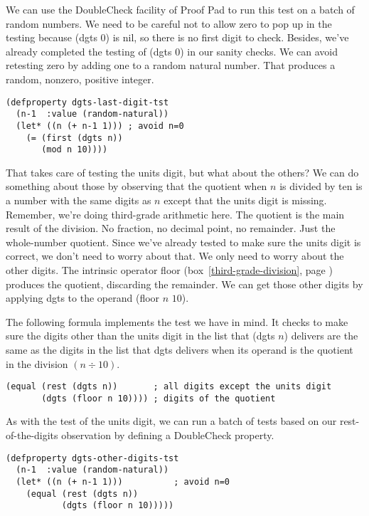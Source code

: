 We can use the DoubleCheck facility of Proof Pad to run this test on a batch of random numbers.
We need to be careful not to allow zero to pop up in the testing
because \textsf{(dgts 0)} is nil, so there is no first digit to check.
Besides, we've already completed the testing of \textsf{(dgts 0)} in our sanity checks.
We can avoid retesting zero by adding one to a random natural number.
That produces a random, nonzero, positive integer.
\begin{code}
\begin{verbatim}
(defproperty dgts-last-digit-tst
  (n-1  :value (random-natural))
  (let* ((n (+ n-1 1))) ; avoid n=0
    (= (first (dgts n))
       (mod n 10))))
\end{verbatim}
\end{code}

That takes care of testing the units digit, but what about the others?
We can do something about those by observing that the quotient
when $n$ is divided by ten
is a number with the same digits as $n$
except that the units digit is missing.
Remember, we're doing third-grade arithmetic here.
The quotient is the main result of the division.
No fraction, no decimal point, no remainder. Just the whole-number quotient.
Since we've already tested to make sure the units digit is correct,
we don't need to worry about that.
We only need to worry about the other digits.
The intrinsic operator \textsf{floor}
(box~\ref{third-grade-division}, page \pageref{third-grade-division})
produces the quotient, discarding the remainder.
We can get those other digits by applying \textsf{dgts} to
the operand \textsf{(floor $n$ $10$)}.

The following formula implements the test we have in mind.
It checks to make sure the digits other than the units digit
in the list that \textsf{(dgts $n$)} delivers
are the same as the digits in the list that
\textsf{dgts} delivers when its operand is the quotient in
the division $(n \div 10)$.
\begin{code}
\begin{verbatim}
(equal (rest (dgts n))       ; all digits except the units digit
       (dgts (floor n 10)))) ; digits of the quotient
\end{verbatim}
\end{code}

As with the test of the units digit,
we can run a batch of tests based on our rest-of-the-digits
observation by defining a DoubleCheck property.
\begin{code}
\begin{verbatim}
(defproperty dgts-other-digits-tst
  (n-1  :value (random-natural))
  (let* ((n (+ n-1 1)))          ; avoid n=0
    (equal (rest (dgts n))
           (dgts (floor n 10)))))
\end{verbatim}
\end{code}

